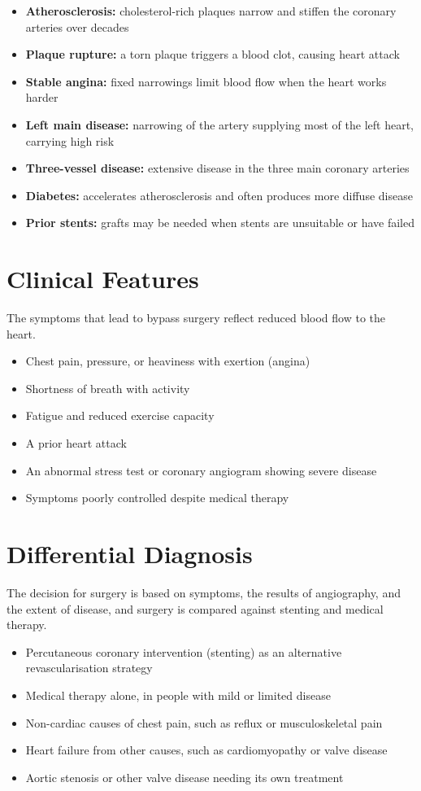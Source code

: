 \begin{itemize}
    \item \textbf{Atherosclerosis:} cholesterol-rich plaques narrow and stiffen the coronary arteries over decades
    \item \textbf{Plaque rupture:} a torn plaque triggers a blood clot, causing heart attack
    \item \textbf{Stable angina:} fixed narrowings limit blood flow when the heart works harder
    \item \textbf{Left main disease:} narrowing of the artery supplying most of the left heart, carrying high risk
    \item \textbf{Three-vessel disease:} extensive disease in the three main coronary arteries
    \item \textbf{Diabetes:} accelerates atherosclerosis and often produces more diffuse disease
    \item \textbf{Prior stents:} grafts may be needed when stents are unsuitable or have failed
\end{itemize}

\section*{Clinical Features}
The symptoms that lead to bypass surgery reflect reduced blood flow to the heart.

\begin{itemize}
    \item Chest pain, pressure, or heaviness with exertion (angina)
    \item Shortness of breath with activity
    \item Fatigue and reduced exercise capacity
    \item A prior heart attack
    \item An abnormal stress test or coronary angiogram showing severe disease
    \item Symptoms poorly controlled despite medical therapy
\end{itemize}

\section*{Differential Diagnosis}
The decision for surgery is based on symptoms, the results of angiography, and the extent of disease, and surgery is compared against stenting and medical therapy.

\begin{itemize}
    \item Percutaneous coronary intervention (stenting) as an alternative revascularisation strategy
    \item Medical therapy alone, in people with mild or limited disease
    \item Non-cardiac causes of chest pain, such as reflux or musculoskeletal pain
    \item Heart failure from other causes, such as cardiomyopathy or valve disease
    \item Aortic stenosis or other valve disease needing its own treatment
\end{itemize}


